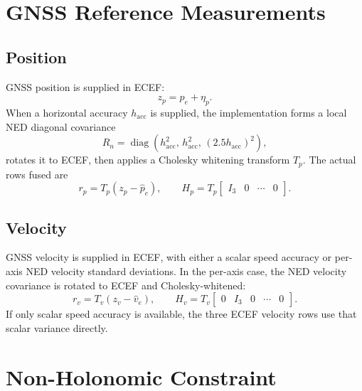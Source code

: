 \documentclass[11pt]{article}
\begin{document}
\section{GNSS Reference Measurements}

\subsection{Position}

GNSS position is supplied in ECEF:
\begin{equation}
  z_p=p_e+\eta_p .
\end{equation}
When a horizontal accuracy \(h_{\mathrm{acc}}\) is supplied, the implementation
forms a local NED diagonal covariance
\begin{equation}
  R_n=\operatorname{diag}\left(h_{\mathrm{acc}}^2,\,
  h_{\mathrm{acc}}^2,\,(2.5h_{\mathrm{acc}})^2\right),
\end{equation}
rotates it to ECEF, then applies a Cholesky whitening transform \(T_p\). The
actual rows fused are
\begin{equation}
  r_p=T_p(z_p-\hat p_e),\qquad H_p=T_p
  \begin{bmatrix}I_3&0&\cdots&0\end{bmatrix}.
\end{equation}

\subsection{Velocity}

GNSS velocity is supplied in ECEF, with either a scalar speed accuracy or
per-axis NED velocity standard deviations. In the per-axis case, the NED
velocity covariance is rotated to ECEF and Cholesky-whitened:
\begin{equation}
  r_v=T_v(z_v-\hat v_e),\qquad H_v=T_v
  \begin{bmatrix}0&I_3&0&\cdots&0\end{bmatrix}.
\end{equation}
If only scalar speed accuracy is available, the three ECEF velocity rows use
that scalar variance directly.

\section{Non-Holonomic Constraint}
\end{document}
